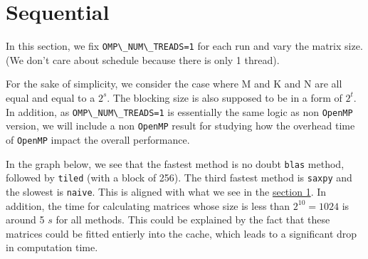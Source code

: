 \documentclass[
  12pt,
  xcolor = usenames,dvipsnames]{article}
\newcommand{\passthrough}[1]{#1}
\begin{document}
\begin{table}[!h]
\centering
{}
\end{table}

\hypertarget{sequential}{%
\section{Sequential}\label{sequential}}

In this section, we fix \passthrough{\lstinline!OMP\_NUM\_TREADS=1!} for each run and vary the matrix size. (We don't care about schedule because there is only 1 thread).

For the sake of simplicity, we consider the case where M and K and N are all equal and equal to a \(2^s\). The blocking size is also supposed to be in a form of \(2^t\). In addition, as \passthrough{\lstinline!OMP\_NUM\_TREADS=1!} is essentially the same logic as non \passthrough{\lstinline!OpenMP!} version, we will include a non \passthrough{\lstinline!OpenMP!} result for studying how the overhead time of \passthrough{\lstinline!OpenMP!} impact the overall performance.

In the graph below, we see that the fastest method is no doubt \passthrough{\lstinline!blas!} method, followed by \passthrough{\lstinline!tiled!} (with a block of 256). The third fastest method is \passthrough{\lstinline!saxpy!} and the slowest is \passthrough{\lstinline!naive!}. This is aligned with what we see in the \protect\hyperlink{techniques}{section 1}. In addition, the time for calculating matrices whose size is less than \(2^{10} = 1024\) is around 5 \(s\) for all methods. This could be explained by the fact that these matrices could be fitted entierly into the cache, which leads to a significant drop in computation time.
\end{document}
